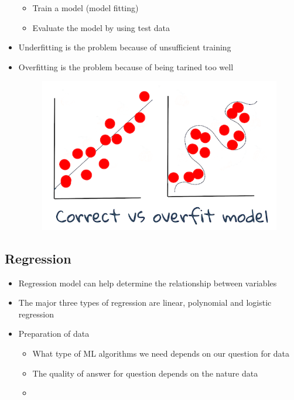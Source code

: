 \documentclass[a4paper,12pt]{ltjsreport}
\begin{document}
\begin{itemize}
\begin{itemize}
          \item Train a model (model fitting)
          \item Evaluate the model by using test data
        \end{itemize}
  \item Underfitting is the problem because of unsufficient training
  \item Overfitting is the problem because of being tarined too well
        \begin{figure}
          \centering
          \includegraphics[keepaspectratio,scale=1]{overfitting.png}
        \end{figure}
\end{itemize}
\subsection*{Regression}
\begin{itemize}
  \item Regression model can help determine the relationship between variables
  \item The major three types of regression are linear, polynomial and logistic regression
  \item Preparation of data
        \begin{itemize}
          \item What type of ML algorithms we need depends on our question for data
          \item The quality of answer for question depends on the nature data
          \item 
        \end{itemize}
\end{itemize}
\end{document}
